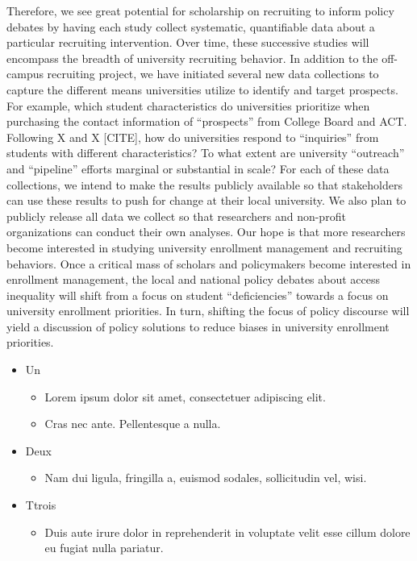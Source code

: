 \documentclass[twoside]{article}
\begin{document}
Therefore, we see great potential for scholarship on recruiting to inform policy debates by having each study collect systematic, quantifiable data about a particular recruiting intervention. Over time, these successive studies will encompass the breadth of university recruiting behavior.  In addition to the off-campus recruiting project, we have initiated several new data collections to capture the different means universities utilize to identify and target prospects.  For example, which student characteristics do universities prioritize when purchasing the contact information of ``prospects'' from College Board and ACT.  Following X and X [CITE], how do universities respond to ``inquiries'' from students with different characteristics? To what extent are university ``outreach'' and ``pipeline'' efforts marginal or substantial in scale? For each of these data collections, we intend to make the results publicly available so that stakeholders can use these results to push for change at their local university. We also plan to publicly release all data we collect so that researchers and non-profit organizations can conduct their own analyses.  Our hope is that more researchers become interested in studying university enrollment management and recruiting behaviors.  Once a critical mass of scholars and policymakers become interested in enrollment management, the local and national policy debates about access inequality will shift from a focus on student ``deficiencies'' towards a focus on university enrollment priorities.  In turn, shifting the focus of policy discourse will yield a discussion of policy solutions to reduce biases in university enrollment priorities.


\begin{itemize}  %
	\item Un
	\begin{itemize}
		\item Lorem ipsum dolor sit amet, consectetuer adipiscing elit.
		\item Cras nec ante. Pellentesque a nulla.
	\end{itemize}
	\item Deux
	\begin{itemize}
		\item Nam dui ligula, fringilla a, euismod sodales, sollicitudin vel, wisi.
	\end{itemize}
	\item Ttrois
	\begin{itemize}
		\item Duis aute irure dolor in reprehenderit in voluptate velit esse cillum dolore eu fugiat nulla pariatur.
	\end{itemize}
	
\end{itemize} 
\end{document}
